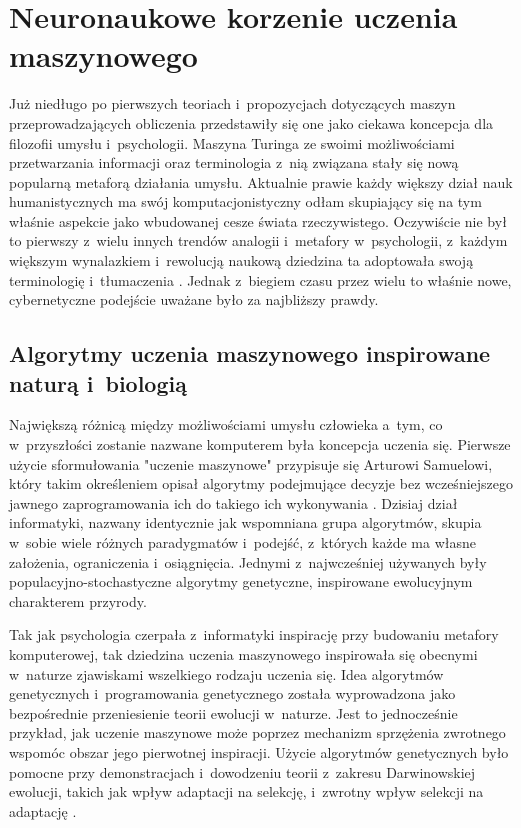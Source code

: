 \chapter{Neuronaukowe korzenie uczenia maszynowego}
\label{chapter1}

Już niedługo po pierwszych teoriach i~propozycjach dotyczących maszyn przeprowadzających obliczenia przedstawiły się one jako ciekawa koncepcja dla filozofii umysłu i~psychologii.
Maszyna Turinga ze swoimi możliwościami przetwarzania informacji oraz terminologia z~nią związana stały się nową popularną metaforą działania umysłu.
Aktualnie prawie każdy większy dział nauk humanistycznych ma swój komputacjonistyczny odłam skupiający się na tym właśnie aspekcie jako wbudowanej cesze świata rzeczywistego.
Oczywiście nie był to pierwszy z~wielu innych trendów analogii i~metafory w~psychologii, z~każdym większym wynalazkiem i~rewolucją naukową dziedzina ta adoptowała swoją terminologię i~tłumaczenia \cite{vroon1987man}.
Jednak z~biegiem czasu przez wielu to właśnie nowe, cybernetyczne podejście uważane było za najbliższy prawdy.

\section{Algorytmy uczenia maszynowego inspirowane naturą i~biologią}

Największą różnicą między możliwościami umysłu człowieka a~tym, co w~przyszłości zostanie nazwane komputerem była koncepcja uczenia się.
Pierwsze użycie sformułowania "uczenie maszynowe" przypisuje się Arturowi Samuelowi, który takim określeniem opisał algorytmy podejmujące decyzje bez wcześniejszego jawnego zaprogramowania ich do takiego ich wykonywania \cite{koza1996automated}.
Dzisiaj dział informatyki, nazwany identycznie jak wspomniana grupa algorytmów, skupia w~sobie wiele różnych paradygmatów i~podejść, z~których każde ma własne założenia, ograniczenia i~osiągnięcia.
Jednymi z~najwcześniej używanych były populacyjno-stochastyczne algorytmy genetyczne, inspirowane ewolucyjnym charakterem przyrody.

Tak jak psychologia czerpała z~informatyki inspirację przy budowaniu metafory komputerowej, tak dziedzina uczenia maszynowego inspirowała się obecnymi w~naturze zjawiskami wszelkiego rodzaju uczenia się.
Idea algorytmów genetycznych i~programowania genetycznego została wyprowadzona jako bezpośrednie przeniesienie teorii ewolucji w~naturze.
Jest to jednocześnie przykład, jak uczenie maszynowe może poprzez mechanizm sprzężenia zwrotnego wspomóc obszar jego pierwotnej inspiracji.
Użycie algorytmów genetycznych było pomocne przy demonstracjach i~dowodzeniu teorii z~zakresu Darwinowskiej ewolucji, takich jak wpływ adaptacji na selekcję, i~zwrotny wpływ selekcji na adaptację \cite{bruderer1996organizational}.

